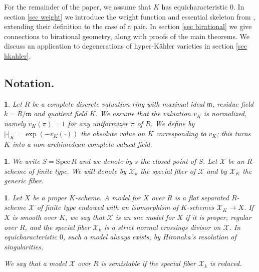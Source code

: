 \documentclass{amsart}%
\numberwithin{equation}{subsection}
\theoremstyle{plain2}
\theoremstyle{definition2}
\theoremstyle{stepstyle}
\theoremstyle{point}
\theoremstyle{subpoint}
\newtheorem{subpoint}[equation]{}%
\newcommand{\spa}[1]{\begin{subpoint}#1\end{subpoint}}           %
\newcommand{\cX}{\ensuremath{\mathscr{X}}}
\newcommand{\mm}{\ensuremath{\mathfrak{m}}}
\newcommand{\Spec}{\ensuremath{\mathrm{Spec}\,}}
\begin{document}
For the remainder of the paper, we assume that $K$ has equicharacteristic $0$. In section \ref{sec weight} we introduce the weight function and essential skeleton from \cite{MustataNicaise}, extending their definition to the case of a pair. In section \ref{sec birational} we give connections to birational geometry, along with proofs of the main theorems. We discuss an application to degenerations of hyper-K{\"a}hler varieties in section \ref{sec hkahler}.

\subsection{Notation.}
\spa{Let $R$ be a complete discrete valuation ring with maximal ideal $\mm$, residue field $k=R/\mm$ and quotient field $K$. We assume that the valuation $v_K$ is normalized, namely $v_K(\pi)=1$ for any uniformizer $\pi$ of $R$. We define by $|\cdot|_K= \exp(- v_K(\cdot))$ the absolute value on $K$ corresponding to $v_K$; this turns $K$ into a non-archimedean complete valued field.}

\spa{ We write $S=\Spec R$ and we denote by $s$ the closed point of $S$. Let $\cX$ be an $R$-scheme of finite type. We will denote by $\cX_k$ the special fiber of $\cX$ and by $\cX_K$ the generic fiber. %
}

\spa{Let $X$ be a proper $K$-scheme. A model for $X$ over $R$ is a flat separated $R$-scheme $\cX$ of finite type endowed with an isomorphism of $K$-schemes $\cX_K \rightarrow X$. If $X$ is smooth over $K$,
we say that $\cX$ is an snc model for $X$ if it is proper, regular over $R$, and the
special fiber $\cX_k$ is a strict normal crossings divisor on $\cX$. In equicharacteristic $0$, such a model always exists, by Hironaka's resolution of singularities.

We say that a model $\cX$ over $R$ is semistable if the special fiber $\cX_k$ is reduced.}
\end{document}
